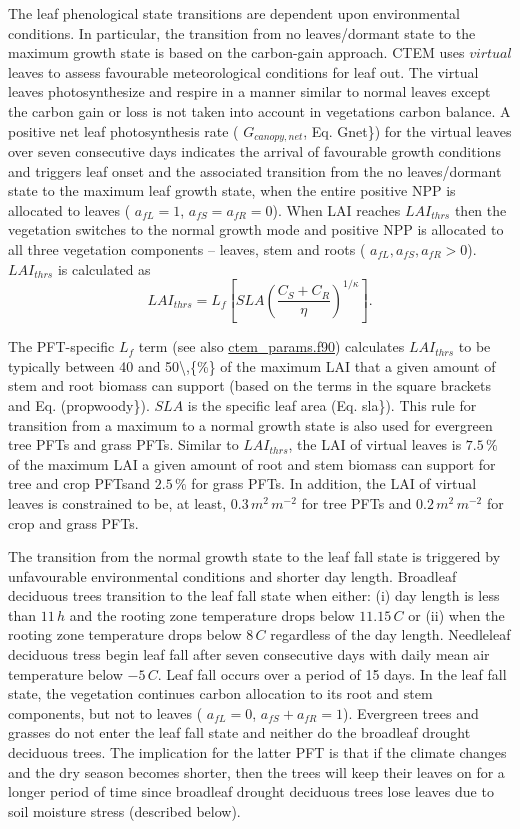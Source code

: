 The leaf phenological state transitions are dependent upon environmental conditions. In particular, the transition from no leaves/dormant state to the maximum growth state is based on the carbon-\/gain approach. C\+T\+E\+M uses $\textit{virtual}$ leaves to assess favourable meteorological conditions for leaf out. The virtual leaves photosynthesize and respire in a manner similar to normal leaves except the carbon gain or loss is not taken into account in vegetation\textquotesingle{}s carbon balance. A positive net leaf photosynthesis rate ( $G_{canopy,net}$, Eq. Gnet\}) for the virtual leaves over seven consecutive days indicates the arrival of favourable growth conditions and triggers leaf onset and the associated transition from the no leaves/dormant state to the maximum leaf growth state, when the entire positive N\+P\+P is allocated to leaves ( $a_{fL} = 1$, $a_{fS} = a_{fR} = 0$). When L\+A\+I reaches ${LAI}_{thrs}$ then the vegetation switches to the normal growth mode and positive N\+P\+P is allocated to all three vegetation components -- leaves, stem and roots ( $a_{fL}, a_{fS}, a_{fR} > 0$). ${LAI}_{thrs}$ is calculated as \[{LAI}_{thrs} = L_f \left[ {SLA}\left(\frac{C_S + C_R}{\eta}\right)^{1/\kappa} \right].\]

The P\+F\+T-\/specific $L_f$ term (see also \hyperlink{ctem__params_8f90}{ctem\+\_\+params.\+f90}) calculates ${LAI}_{thrs}$ to be typically between 40 and 50\textbackslash{},\{\%\} of the maximum L\+A\+I that a given amount of stem and root biomass can support (based on the terms in the square brackets and Eq. (propwoody\}). $SLA$ is the specific leaf area (Eq. sla\}). This rule for transition from a maximum to a normal growth state is also used for evergreen tree P\+F\+Ts and grass P\+F\+Ts. Similar to ${LAI}_{thrs}$, the L\+A\+I of virtual leaves is $7.5\,{\%}$ of the maximum L\+A\+I a given amount of root and stem biomass can support for tree and crop P\+F\+Tsand $2.5\,{\%}$ for grass P\+F\+Ts. In addition, the L\+A\+I of virtual leaves is constrained to be, at least, $0.3\,m^2\,m^{-2}$ for tree P\+F\+Ts and $0.2\,m^2\,m^{-2}$ for crop and grass P\+F\+Ts.

The transition from the normal growth state to the leaf fall state is triggered by unfavourable environmental conditions and shorter day length. Broadleaf deciduous trees transition to the leaf fall state when either\+: (i) day length is less than $11\,h$ and the rooting zone temperature drops below $11.15\,C$ or (ii) when the rooting zone temperature drops below $8\,C$ regardless of the day length. Needleleaf deciduous tress begin leaf fall after seven consecutive days with daily mean air temperature below $-5\,C$. Leaf fall occurs over a period of 15 days. In the leaf fall state, the vegetation continues carbon allocation to its root and stem components, but not to leaves ( $a_{fL} = 0$, $a_{fS} + a_{fR} = 1$). Evergreen trees and grasses do not enter the leaf fall state and neither do the broadleaf drought deciduous trees. The implication for the latter P\+F\+T is that if the climate changes and the dry season becomes shorter, then the trees will keep their leaves on for a longer period of time since broadleaf drought deciduous trees lose leaves due to soil moisture stress (described below).

